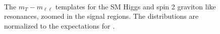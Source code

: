 \begin{figure}[!hbtp]
\centering
{}
\\
\caption{The $m_T-m_{\ell\ell}$ templates for the SM Higgs and 
spin 2 graviton like resonances, zoomed in 
the signal regions. The distributions are 
normalized to the expectations for \intlumiEightTeV.}
\label{fig:mtvsmll_sig}
\end{figure}


